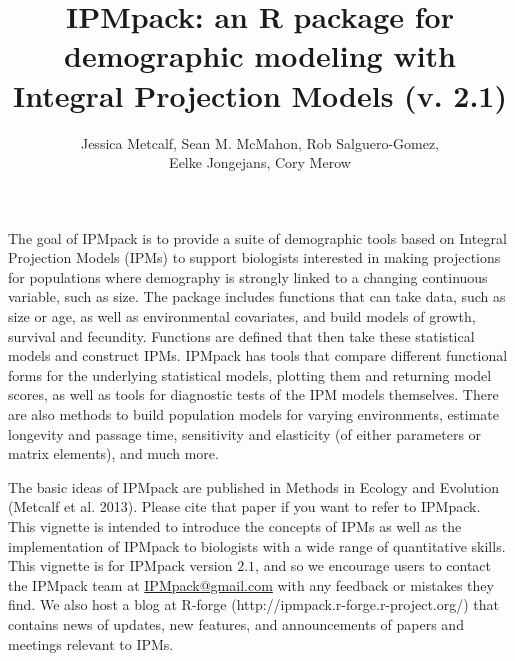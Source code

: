 \documentclass{article}
\begin{document}


\title{IPMpack: an R package for demographic modeling with Integral Projection
Models (v. 2.1)}
\author{Jessica Metcalf, Sean M. McMahon, Rob Salguero-Gomez,\\ Eelke Jongejans, Cory Merow}
\maketitle


The goal of IPMpack is to provide a suite of demographic tools based
on Integral Projection Models (IPMs) to support biologists interested in
making projections for populations where demography is strongly linked to a changing continuous variable, such as size. The package includes functions that can take data, such as size or age, as well as environmental covariates, and build models of growth, survival and fecundity. Functions are defined that then take these
statistical models and construct IPMs. IPMpack has tools that compare different
functional forms for the underlying statistical models, plotting them and
returning model scores, as well as tools for diagnostic tests of the IPM models
themselves. There are also methods to build population models for varying environments, estimate longevity and passage time, sensitivity and elasticity (of either parameters or matrix elements), and much more.

The basic ideas of IPMpack are published in Methods in Ecology and Evolution (Metcalf et al. 2013). Please cite that paper if you want to refer to IPMpack. This vignette is intended to introduce the concepts of IPMs as well as the
implementation of IPMpack to biologists with a wide range of quantitative skills.  This vignette is for IPMpack version $2.1$, and so we encourage users to contact the IPMpack team at \href{IPMpack@gmail.com}{IPMpack@gmail.com} with any feedback or mistakes they find.  We also host a blog at R-forge (http://ipmpack.r-forge.r-project.org/) that contains news of updates, new features, and announcements of papers and meetings relevant to IPMs.
 
\newpage
\end{document}
